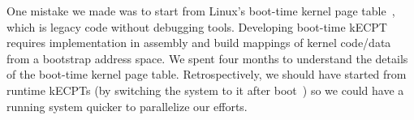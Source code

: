 
One mistake we made was to start from Linux's boot-time kernel page table~\cite{linux:head64s, linux:head64c},
    which is legacy code without debugging tools.
Developing boot-time kECPT requires implementation in assembly
    and build mappings 
    of kernel code/data
    from a bootstrap address space.
We spent four months to understand the details of the boot-time kernel page table.
Retrospectively, we should have started from runtime kECPTs
    (by switching the system to it after boot~\cite{linux:cpucommon})
    so we could have a running system quicker to parallelize our efforts.


